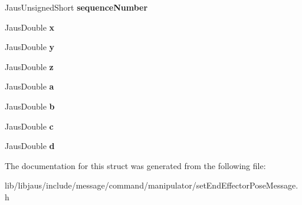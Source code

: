\begin{DoxyCompactItemize}
\item 
\hypertarget{struct_set_end_effector_pose_message_struct_a1fdd9c233edc75074fed35d96d702d62}{\-Jaus\-Unsigned\-Short {\bfseries sequence\-Number}}\label{struct_set_end_effector_pose_message_struct_a1fdd9c233edc75074fed35d96d702d62}

\item 
\hypertarget{struct_set_end_effector_pose_message_struct_a76b346449b062d579cfd0c04e6881e69}{\-Jaus\-Double {\bfseries x}}\label{struct_set_end_effector_pose_message_struct_a76b346449b062d579cfd0c04e6881e69}

\item 
\hypertarget{struct_set_end_effector_pose_message_struct_ae0847794019b097619355ddfebaf36e0}{\-Jaus\-Double {\bfseries y}}\label{struct_set_end_effector_pose_message_struct_ae0847794019b097619355ddfebaf36e0}

\item 
\hypertarget{struct_set_end_effector_pose_message_struct_af798dc230e62e56a3d3f79c8c3e4c3f9}{\-Jaus\-Double {\bfseries z}}\label{struct_set_end_effector_pose_message_struct_af798dc230e62e56a3d3f79c8c3e4c3f9}

\item 
\hypertarget{struct_set_end_effector_pose_message_struct_ac911ebee35b126fd281c15f51f6d86d1}{\-Jaus\-Double {\bfseries a}}\label{struct_set_end_effector_pose_message_struct_ac911ebee35b126fd281c15f51f6d86d1}

\item 
\hypertarget{struct_set_end_effector_pose_message_struct_a6968e26f8f94973da13b277b037a55c3}{\-Jaus\-Double {\bfseries b}}\label{struct_set_end_effector_pose_message_struct_a6968e26f8f94973da13b277b037a55c3}

\item 
\hypertarget{struct_set_end_effector_pose_message_struct_af5674539771af57065f0fd98391ff7d3}{\-Jaus\-Double {\bfseries c}}\label{struct_set_end_effector_pose_message_struct_af5674539771af57065f0fd98391ff7d3}

\item 
\hypertarget{struct_set_end_effector_pose_message_struct_a62b3316ee8eaed3fb958daee27e0a94f}{\-Jaus\-Double {\bfseries d}}\label{struct_set_end_effector_pose_message_struct_a62b3316ee8eaed3fb958daee27e0a94f}

\end{DoxyCompactItemize}


\-The documentation for this struct was generated from the following file\-:\begin{DoxyCompactItemize}
\item 
lib/libjaus/include/message/command/manipulator/set\-End\-Effector\-Pose\-Message.\-h\end{DoxyCompactItemize}

